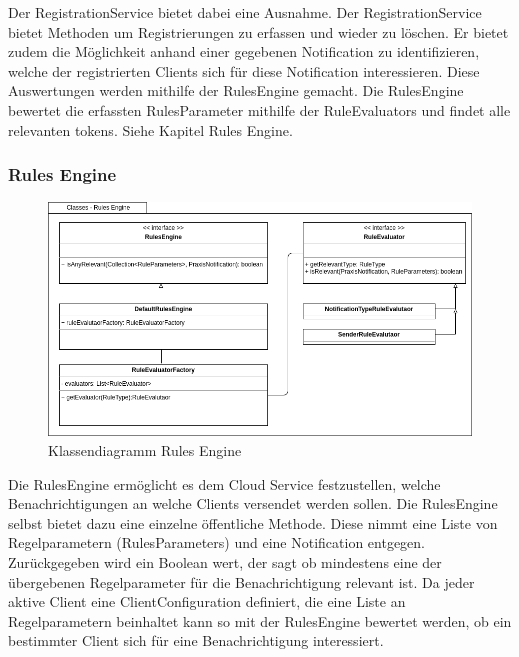 Der RegistrationService bietet dabei eine Ausnahme.
Der RegistrationService bietet Methoden um Registrierungen zu erfassen und wieder zu löschen.
Er bietet zudem die Möglichkeit anhand einer gegebenen Notification zu identifizieren, welche der registrierten Clients sich für diese Notification interessieren.
Diese Auswertungen werden mithilfe der RulesEngine gemacht.
Die RulesEngine bewertet die erfassten RulesParameter mithilfe der RuleEvaluators und findet alle relevanten tokens. Siehe Kapitel Rules Engine.

\clearpage
\subsubsection*{Rules Engine}


\begin{figure}[h]
    \centering
    \begin{minipage}[b]{0.9\textwidth}
        \includegraphics[width=\textwidth]{graphics/Class_Configuration_RulesEngine}
        \caption{Klassendiagramm Rules Engine}
    \end{minipage}
\end{figure}

Die RulesEngine ermöglicht es dem Cloud Service festzustellen, welche Benachrichtigungen an welche Clients versendet werden sollen.
Die RulesEngine selbst bietet dazu eine einzelne öffentliche Methode.
Diese nimmt eine Liste von Regelparametern (RulesParameters) und eine Notification entgegen.
Zurückgegeben wird ein Boolean wert, der sagt ob mindestens eine der übergebenen Regelparameter für die Benachrichtigung relevant ist.
Da jeder aktive Client eine ClientConfiguration definiert, die eine Liste an Regelparametern beinhaltet kann so mit der RulesEngine bewertet werden, ob ein bestimmter Client sich für eine Benachrichtigung interessiert.

